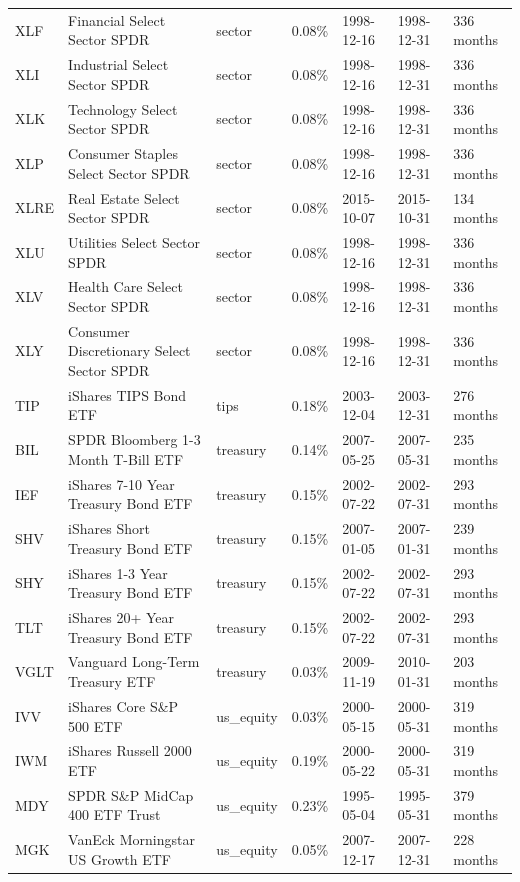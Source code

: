 \begin{tabularx}{\textwidth}{@{}P{0.46in}P{1.06in}P{0.62in}P{0.48in}P{0.50in}P{0.54in}Y@{}}
XLF & Financial Select Sector SPDR & sector & 0.08\% & 1998-12-16 & 1998-12-31 & 336 months \\
XLI & Industrial Select Sector SPDR & sector & 0.08\% & 1998-12-16 & 1998-12-31 & 336 months \\
XLK & Technology Select Sector SPDR & sector & 0.08\% & 1998-12-16 & 1998-12-31 & 336 months \\
XLP & Consumer Staples Select Sector SPDR & sector & 0.08\% & 1998-12-16 & 1998-12-31 & 336 months \\
XLRE & Real Estate Select Sector SPDR & sector & 0.08\% & 2015-10-07 & 2015-10-31 & 134 months \\
XLU & Utilities Select Sector SPDR & sector & 0.08\% & 1998-12-16 & 1998-12-31 & 336 months \\
XLV & Health Care Select Sector SPDR & sector & 0.08\% & 1998-12-16 & 1998-12-31 & 336 months \\
XLY & Consumer Discretionary Select Sector SPDR & sector & 0.08\% & 1998-12-16 & 1998-12-31 & 336 months \\
TIP & iShares TIPS Bond ETF & tips & 0.18\% & 2003-12-04 & 2003-12-31 & 276 months \\
BIL & SPDR Bloomberg 1-3 Month T-Bill ETF & treasury & 0.14\% & 2007-05-25 & 2007-05-31 & 235 months \\
IEF & iShares 7-10 Year Treasury Bond ETF & treasury & 0.15\% & 2002-07-22 & 2002-07-31 & 293 months \\
SHV & iShares Short Treasury Bond ETF & treasury & 0.15\% & 2007-01-05 & 2007-01-31 & 239 months \\
SHY & iShares 1-3 Year Treasury Bond ETF & treasury & 0.15\% & 2002-07-22 & 2002-07-31 & 293 months \\
TLT & iShares 20+ Year Treasury Bond ETF & treasury & 0.15\% & 2002-07-22 & 2002-07-31 & 293 months \\
VGLT & Vanguard Long-Term Treasury ETF & treasury & 0.03\% & 2009-11-19 & 2010-01-31 & 203 months \\
IVV & iShares Core S\&P 500 ETF & us\_equity & 0.03\% & 2000-05-15 & 2000-05-31 & 319 months \\
IWM & iShares Russell 2000 ETF & us\_equity & 0.19\% & 2000-05-22 & 2000-05-31 & 319 months \\
MDY & SPDR S\&P MidCap 400 ETF Trust & us\_equity & 0.23\% & 1995-05-04 & 1995-05-31 & 379 months \\
MGK & VanEck Morningstar US Growth ETF & us\_equity & 0.05\% & 2007-12-17 & 2007-12-31 & 228 months \\

\end{tabularx}
